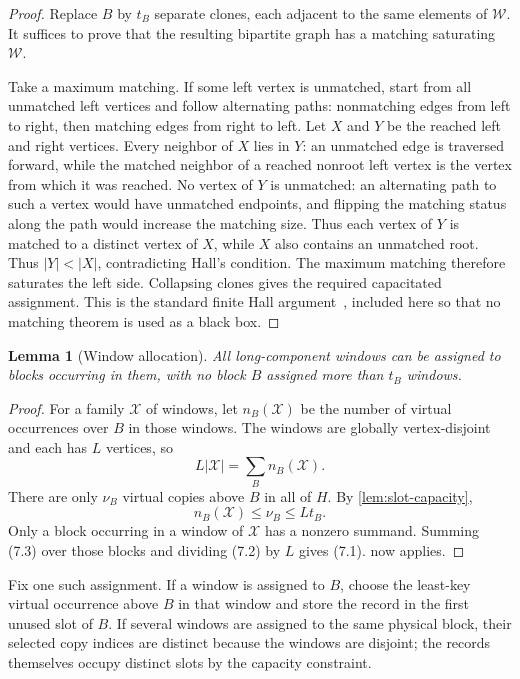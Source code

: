 \documentclass[11pt]{article}
\newtheorem{lemma}[theorem]{Lemma}
\theoremstyle{definition}
\theoremstyle{remark}
\begin{document}
\begin{proof}
Replace $B$ by $t_B$ separate clones, each adjacent to the same elements of
$\mathcal W$.  It suffices to prove that the resulting bipartite graph has a
matching saturating $\mathcal W$.

Take a maximum matching.  If some left vertex is unmatched, start from all
unmatched left vertices and follow alternating paths: nonmatching edges from
left to right, then matching edges from right to left.  Let $X$ and $Y$ be
the reached left and right vertices.  Every neighbor of $X$ lies in $Y$:
an unmatched edge is traversed forward, while the matched neighbor of a
reached nonroot left vertex is the vertex from which it was reached.  No vertex of $Y$ is unmatched: an alternating path to such a vertex
would have unmatched endpoints, and flipping the matching status along
the path would increase the matching size.  Thus
each vertex of $Y$ is matched to a distinct vertex of $X$, while $X$ also
contains an unmatched root.  Thus $|Y|<|X|$, contradicting Hall's condition.
The maximum matching therefore saturates the left side.  Collapsing clones
gives the required capacitated assignment.  This is the standard finite Hall
argument~\cite{Hall1935Representatives}, included here so that no matching
theorem is used as a black box.
\end{proof}

\begin{lemma}[Window allocation]
\label{lem:window-allocation}
All long-component windows can be assigned to blocks occurring in them,
with no block $B$ assigned more than $t_B$ windows.
\end{lemma}

\begin{proof}
For a family $\mathcal X$ of windows, let $n_B(\mathcal X)$ be the number of
virtual occurrences over $B$ in those windows.  The windows are globally
vertex-disjoint and each has $L$ vertices, so
\[
 L|\mathcal X|=\sum_B n_B(\mathcal X).                         \tag{7.2}
\]
There are only $\nu_B$ virtual copies above $B$ in all of $H$.  By
\cref{lem:slot-capacity},
\[
 n_B(\mathcal X)\le\nu_B\le Lt_B.                             \tag{7.3}
\]
Only a block occurring in a window of $\mathcal X$ has a nonzero summand.
Summing (7.3) over those blocks and dividing (7.2) by $L$ gives (7.1).
 now applies.
\end{proof}

Fix one such assignment.  If a window is assigned to $B$, choose the
least-key virtual occurrence above $B$ in that window and store the record
in the first unused slot of $B$.  If several windows are assigned to the
same physical block, their selected copy indices are distinct because the
windows are disjoint; the records themselves occupy distinct slots by the
capacity constraint.
\end{document}
